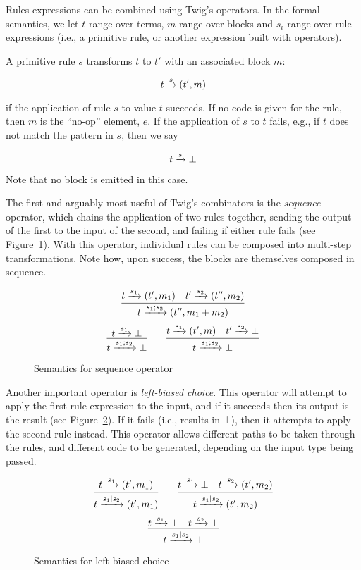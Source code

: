 Rules expressions can be combined using Twig's operators. In the formal semantics, we let $t$ range over terms, $m$ range over blocks and $s_i$ range over rule expressions (i.e., a primitive rule, or another expression built with operators).

A primitive rule $s$ transforms $t$ to $t'$ with an associated  block $m$:

\[
t \xrightarrow{s} (t',m)
\]

if the application of rule $s$ to value $t$ succeeds. If no code is given for the rule, then $m$ is the ``no-op'' element, $e$. If the application of $s$ to $t$ fails, e.g., if $t$ does not match the pattern in $s$, then we say

\[
t \xrightarrow{s} \bot
\]

Note that no block is emitted in this case.

The first and arguably most useful of Twig's combinators is the \emph{sequence} operator, which chains the application of two rules together, sending the output of the first to the input of the second, and failing if either rule fails (see Figure~\ref{fig:seq}). With this operator, individual rules can be composed into multi-step transformations. Note how, upon success, the blocks are themselves composed in sequence.

\begin{figure}[ht]
\label{fig:seq}
\[
\infer
  {t \arr{s_1;s_2} (t'',m_1+m_2)}
  {t \arr{s_1} (t',m_1) \quad t' \arr{s_2} (t'',m_2)}
\]
\[
\infer
  {t \arr{s_1;s_2} \bot}
  {t \arr{s_1} \bot}
\qquad
\infer
  {t \arr{s_1;s_2} \bot}
  {t \arr{s_1} (t',m) \quad t' \arr{s_2} \bot}
\]
\caption{Semantics for sequence operator}
\end{figure}

Another important operator is \emph{left-biased choice}. This operator will attempt to apply the first rule expression to the input, and if it succeeds then its output is the result (see Figure~\ref{fig:choice}). If it fails (i.e., results in $\bot$), then it attempts to apply the second rule instead. This operator allows different paths to be taken through the rules, and different code to be generated, depending on the input type being passed.

\begin{figure}[ht]
\label{fig:choice}
\[
\infer
  {t \arr{s_1|s_2} (t',m_1)}
  {t \arr{s_1} (t',m_1)}
\qquad
\infer
  {t \arr{s_1|s_2} (t',m_2)}
  {t \arr{s_1} \bot \quad t \arr{s_2} (t',m_2)}
\]
\[
\infer
  {t \arr{s_1|s_2} \bot}
  {t \arr{s_1} \bot \quad t \arr{s_2} \bot}
\]
\caption{Semantics for left-biased choice}
\end{figure}

